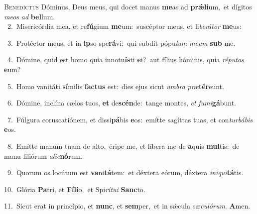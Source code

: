 \lettrine{\initial\textcolor{\initialcolor}{B}}{enedíctus} Dóminus, Deus meus, qui docet manus \textbf{me}\-as ad \textbf{prǽ}\-\textbf{li}um,~\star et dígitos \textit{me}\-\textit{os} \textit{ad} \textbf{bel}\-lum.\\
{\numbfont\textcolor{\numbcolor}{~2.}}~Misericórdia mea, et re\-\textbf{fú}\-gium \textbf{me}\-um:~\star suscéptor meus, et li\-\textit{be}\-\textit{rá}\textit{tor} \textbf{me}\-us:\par
{\numbfont\textcolor{\numbcolor}{~3.}}~Protéctor meus, et in \textbf{ip}\-so spe\-\textbf{rá}\-vi:~\star qui subdit pópu\textit{lum} \textit{me}\-\textit{um} \textbf{sub} me.\par
{\numbfont\textcolor{\numbcolor}{~4.}}~Dómine, quid est homo quia innotu\-\textbf{ís}\-ti \textbf{e}\-i?~\star aut fílius hóminis, quia \textit{ré}\-\textit{pu}\textit{tas} \textbf{e}\-um?\par
{\numbfont\textcolor{\numbcolor}{~5.}}~Homo vanitáti \textbf{sí}\-milis \textbf{fac}\-\textbf{tus} est:~\star dies ejus sicut \textit{um}\-\textit{bra} \textit{præ}\-\textbf{tér}eunt.\par
{\numbfont\textcolor{\numbcolor}{~6.}}~Dómine, inclína cælos tuos, \textbf{et} de\-\textbf{scén}\-de:~\star tange montes, \textit{et} \textit{fu}\-\textit{mi}\textbf{gá}bunt.\par
{\numbfont\textcolor{\numbcolor}{~7.}}~Fúlgura coruscatiónem, et dissi\-\textbf{pá}\-bis \textbf{e}\-os:~\star emítte sagíttas tuas, et con\-\textit{tur}\-\textit{bá}\textit{bis} \textbf{e}\-os.\par
{\numbfont\textcolor{\numbcolor}{~8.}}~Emítte manum tuam de alto,~\dagger éripe me, et líbera me de \textbf{a}\-quis \textbf{mul}\-tis:~\star de manu filiórum \textit{a}\-\textit{li}\textit{e}\textbf{nó}rum.\par
{\numbfont\textcolor{\numbcolor}{~9.}}~Quorum os locútum est \textbf{va}\-ni\-\textbf{tá}\-tem:~\star et déxtera eórum, déxtera \textit{in}\-\textit{i}\textit{qui}\textbf{tá}tis.\par
{\numbfont\textcolor{\numbcolor}{10.}}~Glória \textbf{Pa}\-tri, et \textbf{Fí}\-\textbf{li}o,~\star et Spi\-\textit{rí}\-\textit{tu}\textit{i} \textbf{Sanc}\-to.\par
{\numbfont\textcolor{\numbcolor}{11.}}~Sicut erat in princípio, et \textbf{nunc}\-, et \textbf{sem}\-per,~\star et in sǽcula sæ\-\textit{cu}\-\textit{ló}\textit{rum}. \textbf{A}\-men.\par
